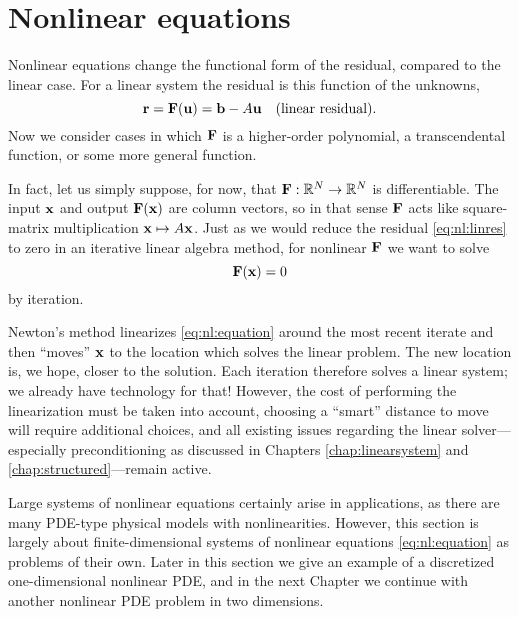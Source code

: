 \renewcommand{\CODELOC}{c/ch4/}

\chapter{Nonlinear equations}
\label{chap:nonlinear}

Nonlinear equations change the functional form of the residual, compared to the linear case.  For a linear system the residual is this function of the unknowns,
\begin{equation}
\mathbf{r} = \mathbf{F}(\mathbf{u}) = \mathbf{b} - A \mathbf{u} \quad (\text{linear residual}). \label{eq:nl:linres}
\end{equation}
Now we consider cases in which $\mathbf{F}$ is a higher-order polynomial, a transcendental function, or some more general function.

In fact, let us simply suppose, for now, that $\mathbf{F} : \mathbb{R}^N \to \mathbb{R}^N$ is differentiable.  The input $\mathbf{x}$ and output $\mathbf{F}(\mathbf{x})$ are column vectors, so in that sense $\mathbf{F}$ acts like square-matrix multiplication $\mathbf{x}\mapsto A\mathbf{x}$.  Just as we would reduce the residual \eqref{eq:nl:linres} to zero in an iterative linear algebra method, for nonlinear $\mathbf{F}$ we want to solve
\begin{equation}
   \mathbf{F}(\mathbf{x}) = 0   \label{eq:nl:equation}
\end{equation}
by iteration.

Newton's method linearizes \eqref{eq:nl:equation} around the most recent iterate and then ``moves'' $\mathbf{x}$ to the location which solves the linear problem.  The new location is, we hope, closer to the solution.  Each iteration therefore solves a linear system; we already have \PETSc technology for that!  However, the cost of performing the linearization must be taken into account, choosing a ``smart'' distance to move will require additional choices, and all existing issues regarding the linear solver---especially preconditioning as discussed in Chapters \ref{chap:linearsystem} and \ref{chap:structured}---remain active.

Large systems of nonlinear equations certainly arise in applications, as there are many PDE-type physical models with nonlinearities.  However, this section is largely about finite-dimensional systems of nonlinear equations \eqref{eq:nl:equation} as problems of their own.  Later in this section we give an example of a discretized one-dimensional nonlinear PDE, and in the next Chapter we continue with another nonlinear PDE problem in two dimensions.


